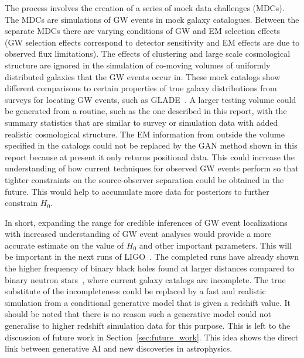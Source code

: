 \documentclass[twocolumn]{article}
\numberwithin{equation}{section}
\begin{document}
The process involves the creation of a series of mock data challenges (MDCs). The MDCs are simulations of GW events 
in mock galaxy catalogues. Between the separate MDCs there are varying conditions of GW and EM selection effects 
(GW selection effects correspond to detector sensitivity and EM effects are due to observed flux limitations). The 
effects of clustering and large scale cosmological structure are ignored in the simulation of co-moving volumes of 
uniformly distributed galaxies that the GW events occur in. These mock catalogs show different comparisons to 
certain properties of true galaxy distributions from surveys for locating GW events, such as GLADE~\cite{GLADE}. %
A larger testing volume could be generated from a routine, such as the one described in this report, with the summary 
statistics that are similar to survey or simulation data with added realistic cosmological structure. The EM 
information from outside the volume specified in the catalogs could not be replaced by the GAN method shown in this 
report because at present it only returns positional data. This could increase the understanding of how current 
techniques for observed GW events perform so that tighter constraints on the source-observer separation could be 
obtained in the future. This would help to accumulate more data for posteriors to further constrain $H_0$.


In short, expanding the range for credible inferences of GW event localizations with increased understanding of GW event 
analyses would provide a more accurate estimate on the value of $H_0$ and other important parameters. This will be 
important in the next runs of LIGO~\cite{future_ligo}. The completed runs have already shown the higher frequency of 
binary black holes found at larger distances compared to binary neutron stars~\cite{GW_BNS_BBH_catalog}, where current 
galaxy catalogs are incomplete. The true substitute of the incompleteness could be replaced by a fast and realistic 
simulation from a conditional generative model that is given a redshift value. It should be noted that there is no reason
such a generative model could not generalise to higher redshift simulation data for this purpose. This is left to the 
discussion of future work in Section~\ref{sec:future_work}. This idea shows the direct link between generative AI and 
new discoveries in astrophysics.
\end{document}
